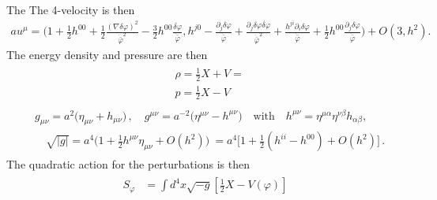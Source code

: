 The 
The 4-velocity is then
\begin{align}
    au^\mu = \Big(1+\tfrac12 h^{00}+\tfrac12 \tfrac{(\nabla\delta\varphi)^2}{\dot{\bar{\varphi}}^2}-\tfrac32 h^{00}\tfrac{\dot{\delta\varphi}}{\dot{\bar{\varphi}}}, h^{j0}-\tfrac{\partial_j\delta\varphi}{\dot{\bar{\varphi}}}+\tfrac{\partial_j\delta\varphi \dot{\delta\varphi}}{\dot{\bar{\varphi}}^2}
    +\tfrac{h^{ji}\partial_i\delta\varphi }{\dot{\bar{\varphi}}}+\tfrac12 h^{00}\tfrac{\partial_j\delta\varphi}{\dot{\bar{\varphi}}}\Big)+O(3,h^2).
\end{align}
The energy density and pressure are then
\begin{align}
\begin{aligned}
    &\rho = \tfrac12 X + V = \\[3pt]
    &p= \tfrac12 X - V 
\end{aligned}
\end{align}
{\small \begin{align}\label{eq:general_perturbed_FLRW_metric}
\begin{aligned}
    &g_{\mu\nu}=a^2\Big(\eta_{\mu\nu}+h_{\mu\nu}\Big)\,,\quad g^{\mu\nu}=a^{-2}\Big(\eta^{\mu\nu}-h^{\mu\nu}\Big)\quad \text{with} \quad h^{\mu\nu}=\eta^{\mu\alpha}\eta^{\nu\beta}h_{\alpha\beta},\\
    &\quad \sqrt{|g|}= a^4\big(1+\tfrac12 h^{\mu\nu}\eta_{\mu\nu} +O(h^2)\big)\ = a^4\Big[1+\tfrac12 (h^{ii}-h^{00}) +O(h^2)\Big]\,.
\end{aligned}
\end{align}}
The quadratic action for the perturbations is then
\begin{align}
\begin{aligned}
    S_\varphi&= \int d^4x \sqrt{-g} \left[\tfrac12 X - V(\varphi)\right]\\
\end{aligned}
\end{align}
    